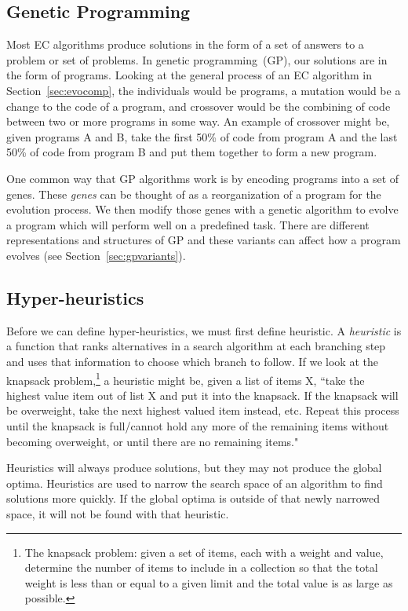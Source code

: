 \documentclass{sig-alternate}
\begin{document}
\subsection{Genetic Programming}
\label{sec:GP}
Most EC algorithms produce solutions in the form of a set of answers to a problem or set of problems. In genetic programming~(GP), our solutions are in the form of programs. Looking at the general process of an EC algorithm in Section~\ref{sec:evocomp}, the individuals would be programs, a mutation would be a change to the code of a program, and crossover would be the combining of code between two or more programs in some way. An example of crossover might be, given programs A and B, take the first 50\% of code from program A and the last 50\% of code from program B and put them together to form a new program.

One common way that GP algorithms work is by encoding programs into a set of genes. These \textit{genes} can be thought of as a reorganization of a program for the evolution process. We then modify those genes with a genetic algorithm to evolve a program which will perform well on a predefined task. There are different representations and structures of GP and these variants can affect how a program evolves (see Section~\ref{sec:gpvariants}).

\subsection{Hyper-heuristics}
\label{sec:HH}
Before we can define hyper-heuristics, we must first define heuristic. A \textit{heuristic} is a function that ranks alternatives in a search algorithm at each branching step and uses that information to choose which branch to follow. If we look at the knapsack problem,\footnote{The knapsack problem: given a set of items, each with a weight and value, determine the number of items to include in a collection so that the total weight is less than or equal to a given limit and the total value is as large as possible.} a heuristic might be, given a list of items X, ``take the highest value item out of list X and put it into the knapsack. If the knapsack will be overweight, take the next highest valued item instead, etc. Repeat this process until the knapsack is full/cannot hold any more of the remaining items without becoming overweight, or until there are no remaining items."

Heuristics will always produce solutions, but they may not produce the global optima. Heuristics are used to narrow the search space of an algorithm to find solutions more quickly. If the global optima is outside of that newly narrowed space, it will not be found with that heuristic.
\end{document}
